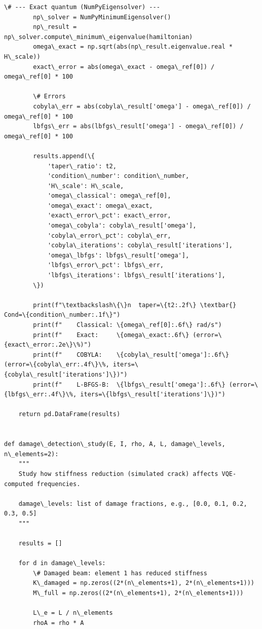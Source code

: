 \documentclass[12pt, a4paper]{article}
\begin{document}
\begin{lstlisting}[style=codestyle, caption={{novel_study.py --- Ill-Conditioning & Damage Detection}}]
        \# --- Exact quantum (NumPyEigensolver) ---
        np\_solver = NumPyMinimumEigensolver()
        np\_result = np\_solver.compute\_minimum\_eigenvalue(hamiltonian)
        omega\_exact = np.sqrt(abs(np\_result.eigenvalue.real * H\_scale))
        exact\_error = abs(omega\_exact - omega\_ref[0]) / omega\_ref[0] * 100

        \# Errors
        cobyla\_err = abs(cobyla\_result['omega'] - omega\_ref[0]) / omega\_ref[0] * 100
        lbfgs\_err = abs(lbfgs\_result['omega'] - omega\_ref[0]) / omega\_ref[0] * 100

        results.append(\{
            'taper\_ratio': t2,
            'condition\_number': condition\_number,
            'H\_scale': H\_scale,
            'omega\_classical': omega\_ref[0],
            'omega\_exact': omega\_exact,
            'exact\_error\_pct': exact\_error,
            'omega\_cobyla': cobyla\_result['omega'],
            'cobyla\_error\_pct': cobyla\_err,
            'cobyla\_iterations': cobyla\_result['iterations'],
            'omega\_lbfgs': lbfgs\_result['omega'],
            'lbfgs\_error\_pct': lbfgs\_err,
            'lbfgs\_iterations': lbfgs\_result['iterations'],
        \})

        print(f"\textbackslash\{\}n  taper=\{t2:.2f\} \textbar{} Cond=\{condition\_number:.1f\}")
        print(f"    Classical: \{omega\_ref[0]:.6f\} rad/s")
        print(f"    Exact:     \{omega\_exact:.6f\} (error=\{exact\_error:.2e\}\%)")
        print(f"    COBYLA:    \{cobyla\_result['omega']:.6f\} (error=\{cobyla\_err:.4f\}\%, iters=\{cobyla\_result['iterations']\})")
        print(f"    L-BFGS-B:  \{lbfgs\_result['omega']:.6f\} (error=\{lbfgs\_err:.4f\}\%, iters=\{lbfgs\_result['iterations']\})")

    return pd.DataFrame(results)


def damage\_detection\_study(E, I, rho, A, L, damage\_levels, n\_elements=2):
    """
    Study how stiffness reduction (simulated crack) affects VQE-computed frequencies.

    damage\_levels: list of damage fractions, e.g., [0.0, 0.1, 0.2, 0.3, 0.5]
    """

    results = []

    for d in damage\_levels:
        \# Damaged beam: element 1 has reduced stiffness
        K\_damaged = np.zeros((2*(n\_elements+1), 2*(n\_elements+1)))
        M\_full = np.zeros((2*(n\_elements+1), 2*(n\_elements+1)))

        L\_e = L / n\_elements
        rhoA = rho * A


\end{lstlisting}
\end{document}
